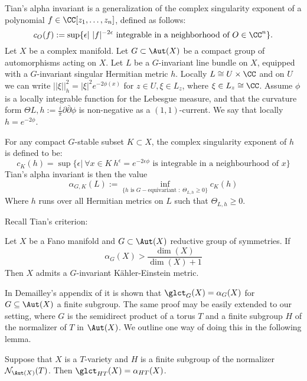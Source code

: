 Tian's alpha invariant is a generalization of the complex singularity exponent of a polynomial \(f \in \CC[z_1,\dots,z_n]\), defined as follows:
\[
c_O(f) := \sup \{ \epsilon | \ |f|^{-2 \epsilon} \text{ integrable  in a neighborhood of } O \in \CC^n \} .
\]
Let \(X\) be a complex manifold. Let \(G \subset \Aut( X)\) be a compact group of automorphisms acting on \(X\). Let \(L\) be a \(G\)-invariant line bundle on \(X\), equipped with a \(G\)-invariant singular Hermitian metric \(h\). Locally \(L \cong U \times \CC\) and on \(U\) we can write \(||\xi||_h^2 = |\xi|^2 e^{-2 \phi(x)}\) for \(z \in U, \xi \in L_z\), where \(\xi \in L_z \cong \CC\). Assume \(\phi\) is a locally integrable function for the Lebesgue measure, and that the curvature form \(\Theta{L,h} := \frac{i}{\pi} \partial \bar{\partial} \phi\) is non-negative as a \((1,1)\)-current. We say that locally \(h = e^{-2 \phi}\).
\begin{definition}
For any compact \(G\)-stable subset \(K \subset X\), the complex singularity exponent of \(h\) is defined to be:
\[
c_K(h) = \sup \{ \epsilon | \ \forall x \in K \ h^\epsilon = e^{-2 \epsilon \phi} \text{ is integrable in a neighbourhood of } x\}
\]
Tian's alpha invariant is then the value
\[
\alpha_{G,K}(L) := \inf_{\{h \text{ is } G-\text{equivariant } : \ \Theta_{L,h} \ge 0\}} c_K(h)
\]
Where \(h\) runs over all Hermitian metrics on \(L\) such that \(\Theta_{L,h} \ge 0\).
\end{definition}
Recall Tian's criterion:
\begin{theorem}\label{thm:tcrit}
Let \(X\) be a Fano manifold and \(G \subset \Aut(X)\) reductive group of symmetries. If
\[
\alpha_{G} (X) > \frac{\dim(X)}{\dim(X) + 1}
\]
Then \(X\) admits a \(G\)-invariant K\"ahler-Einstein metric.
\end{theorem}
In Demailley's appendix of \cite{cheltsov08} it is shown that \(\glct_{G}(X) = \alpha_G(X)\) for \(G \subseteq \Aut(X)\) a finite subgroup. The same proof may be easily extended to our setting, where \(G\) is the semidirect product of a torus \(T\) and a finite subgroup  \(H\) of the normalizer of \(T\) in \(\Aut(X)\). We outline one way of doing this in the following lemma.
\begin{lemma}
Suppose that \(X\) is a \(T\)-variety and \(H\) is a finite subgroup of the normalizer \( \mathcal{N}_{\Aut(X)}(T)\). Then \(\glct_{HT}(X) = \alpha_{HT}(X)\).
\end{lemma}
